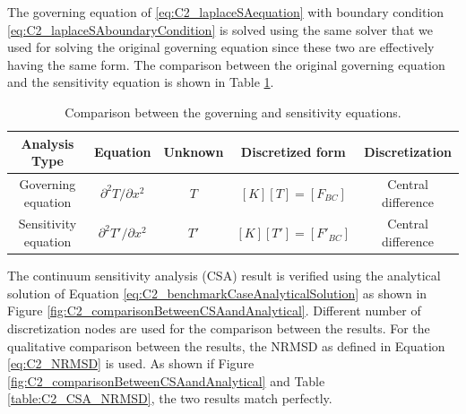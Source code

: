 The governing equation of \eqref{eq:C2_laplaceSAequation} with boundary condition \eqref{eq:C2_laplaceSAboundaryCondition} is solved using the same solver that we used for solving the original governing equation since these two are effectively having the same form. The comparison between the original governing equation and the sensitivity equation is shown in Table \ref{table:C2_comparisonBetweenGEandSA}.
%
\begin{table}[h]
\begin{tabular}{| c | c | c | c | c |}
    \hline
    Analysis Type & Equation & Unknown & Discretized form & Discretization \\ \hline \hline
    Governing equation & $\partial^2 T/\partial x^2$ & $T$ & $[K][T] = [F_{BC}]$ & Central difference \\ \hline
    Sensitivity equation & $\partial^2 T'/\partial x^2$ & $T'$ & $[K][T'] = [F'_{BC}]$ & Central difference \\ \hline
\end{tabular}
\caption{Comparison between the governing and sensitivity equations.}
\label{table:C2_comparisonBetweenGEandSA}
\end{table}
%
The continuum sensitivity analysis (CSA) result is verified using the analytical solution of Equation \eqref{eq:C2_benchmarkCaseAnalyticalSolution} as shown in Figure \ref{fig:C2_comparisonBetweenCSAandAnalytical}. Different number of discretization nodes are used for the comparison between the results. For the qualitative comparison between the results, the NRMSD as defined in Equation \eqref{eq:C2_NRMSD} is used. As shown if Figure \ref{fig:C2_comparisonBetweenCSAandAnalytical} and Table \ref{table:C2_CSA_NRMSD}, the two results match perfectly.
%
